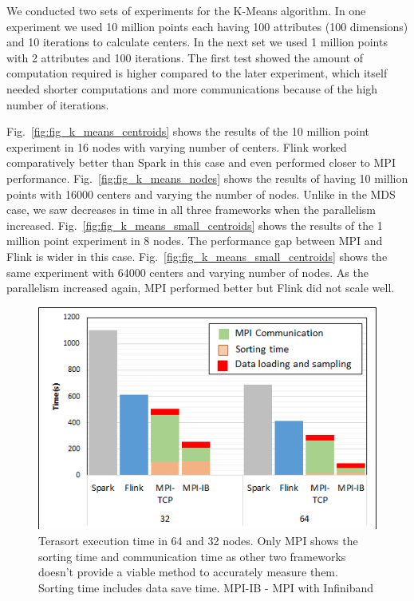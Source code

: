 \documentclass[conference]{IEEEtran}
\begin{document}
We conducted two sets of experiments for the K-Means algorithm. In one experiment we used 10 million points each having 100 attributes (100 dimensions) and 10 iterations to calculate centers. In the next set we used 1 million points with 2 attributes and 100 iterations. The first test showed the amount of computation required is higher compared to the later experiment, which itself needed shorter computations and more communications because of the high number of iterations.

Fig.~\ref{fig:fig_k_means_centroids} shows the results of the 10 million point experiment in 16 nodes with varying number of centers. Flink worked comparatively better than Spark in this case and even performed closer to MPI performance. Fig.~\ref{fig:fig_k_means_nodes} shows the results of having 10 million points with 16000 centers and varying the number of nodes. Unlike in the MDS case, we saw decreases in time in all three frameworks when the parallelism increased. Fig.~\ref{fig:fig_k_means_small_centroids} shows the results of the 1 million point experiment in 8 nodes. The performance gap between MPI and Flink is wider in this case. Fig.~\ref{fig:fig_k_means_small_centroids} shows the same experiment with 64000 centers and varying number of nodes. As the parallelism increased again, MPI performed better but Flink did not scale well.

\begin{figure}
    \centering
    \includegraphics[width=0.9\columnwidth]{images/terasort-bar2.png}
    \caption{Terasort execution time in 64 and 32 nodes. Only MPI shows the sorting time and communication time as other two frameworks doesn't provide a viable method to accurately measure them. Sorting time includes data save time. MPI-IB - MPI with Infiniband}
    \label{fig:terasort_time}
\end{figure}
\end{document}
